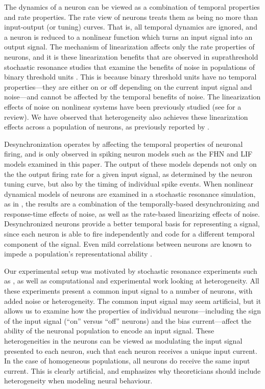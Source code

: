 \documentclass[12pt]{article}
\begin{document}
The dynamics of a neuron can be viewed as a combination of temporal properties and rate properties. The rate view of neurons treats them as being no more than input-output (or tuning) curves. That is, all temporal dynamics are ignored, and a neuron is reduced to a nonlinear function which turns an input signal into an output signal. The mechanism of linearization affects only the rate properties of neurons, and it is these linearization benefits that are observed in suprathreshold stochastic resonance studies that examine the benefits of noise in populations of binary threshold units \citep{Stocks2000,Stocks2001a,McDonnell2006}. This is because binary threshold units have no temporal properties---they are either on or off depending on the current input signal and noise---and cannot be affected by the temporal benefits of noise. The linearization effects of noise on nonlinear systems have been previously studied (see \cite{Stocks1996} for a review). We have observed that heterogeneity also achieves these linearization effects across a population of neurons, as previously reported by \cite{Eliasmith2003}.

Desynchronization operates by affecting the temporal properties of neuronal firing, and is only observed in spiking neuron models such as the FHN and LIF models examined in this paper. The output of these models depends not only on the the output firing rate for a given input signal, as determined by the neuron tuning curve, but also by the timing of individual spike events. When nonlinear dynamical models of neurons are examined in a stochastic resonance simulation, as in \cite{Stocks2001}, the results are a combination of the temporally-based desynchronizing and response-time effects of noise, as well as the rate-based linearizing effects of noise.  Desynchronized neurons provide a better temporal basis for representing a signal, since each neuron is able to fire independently and code for a different temporal component of the signal. Even mild correlations between neurons are known to impede a population's representational ability \citep{Zohary1994}.

Our experimental setup was motivated by stochastic resonance experiments such as \cite{Stocks2001}, as well as computational \citep{Brody2003} and experimental \citep{Padmanabhan2010} work looking at heterogeneity. All these experiments present a common input signal to a number of neurons, with added noise or heterogeneity. The common input signal may seem artificial, but it allows us to examine how the properties of individual neurons---including the sign of the input signal (``on'' versus ``off'' neurons) and the bias current---affect the ability of the neuronal population to encode an input signal. These heterogeneities in the neurons can be viewed as modulating the input signal presented to each neuron, such that each neuron receives a unique input current. In the case of homogeneous populations, all neurons do receive the same input current. This is clearly artificial, and emphasizes why theoreticians should include heterogeneity when modeling neural behaviour.
\end{document}
